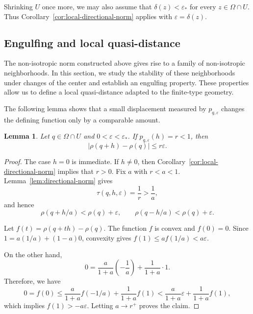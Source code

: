 \documentclass[11pt]{article}
\newtheorem{lemma}[theorem]{Lemma}
\theoremstyle{definition}
\newcommand{\eps}{\varepsilon}
\begin{document}
Shrinking \(U\) once more, we may also assume that
\(\delta(z)<\eps_*\) for every \(z\in\Omega\cap U\).
Thus Corollary~\ref{cor:local-directional-norm} applies with
\(\eps=\delta(z)\).



\subsection{Engulfing and local quasi-distance}
\label{subsec:center-engulfing-quasidistance}

The non-isotropic norm constructed above gives rise to a family of
non-isotropic neighborhoods.  In this section, we study the stability of these
neighborhoods under changes of the center and establish an engulfing
property.  These properties allow us to define a local quasi-distance
adapted to the finite-type geometry.

The following lemma shows that a small displacement measured by
\(p_{q,\eps}\) changes the defining function only by a comparable amount.

\begin{lemma}\label{lem:level-displacement}
Let \(q\in\Omega\cap U\) and \(0<\eps<\eps_*\).  If
\(p_{q,\eps}(h)=r<1\), then
\[
 |\rho(q+h)-\rho(q)|\le r\eps.
\]
\end{lemma}

\begin{proof}
The case \(h=0\) is immediate.  If \(h\ne0\), then
Corollary~\ref{cor:local-directional-norm} implies that \(r>0\).  Fix \(a\)
with \(r<a<1\).
Lemma~\ref{lem:directional-norm} gives
\[
\tau(q,h,\eps)=\frac1r>\frac1a,
\]
and hence
\[
 \rho(q+h/a)<\rho(q)+\eps,
 \qquad
 \rho(q-h/a)<\rho(q)+\eps.
\]

Let
\(
f(t)=\rho(q+th)-\rho(q).
\)
The function \(f\) is convex and \(f(0)=0\).  Since
\(1=a(1/a)+(1-a)0\),
convexity gives
\(f(1)\le af(1/a)<a\eps\).

On the other hand,
\[
0=\frac{a}{1+a}\left(-\frac1a\right)
+\frac1{1+a}\cdot1.
\]
Therefore, we have
\[
0=f(0)
\le
\frac{a}{1+a}f(-1/a)+\frac1{1+a}f(1)
<
\frac{a}{1+a}\eps+\frac1{1+a}f(1),
\]
which implies
\(
f(1)>-a\eps.
\)
Letting \(a\to r^+\) proves the claim.
\end{proof}
\end{document}
